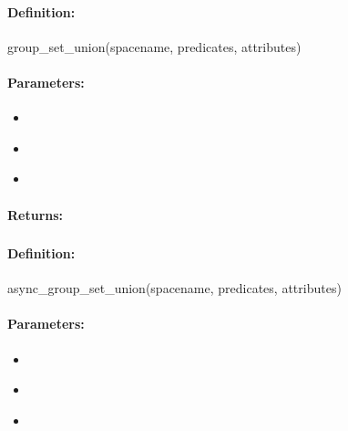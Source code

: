 \paragraph{Definition:}
\begin{rubycode}
group_set_union(spacename, predicates, attributes)
\end{rubycode}

\paragraph{Parameters:}
\begin{itemize}[noitemsep]
\item {}\\

\item {}\\

\item {}\\

\end{itemize}

\paragraph{Returns:}


\pagebreak
\subsubsection{}
\label{api:ruby:async_group_set_union}


\paragraph{Definition:}
\begin{rubycode}
async_group_set_union(spacename, predicates, attributes)
\end{rubycode}

\paragraph{Parameters:}
\begin{itemize}[noitemsep]
\item {}\\

\item {}\\

\item {}\\

\end{itemize}

